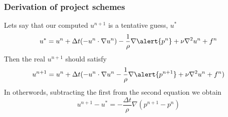 \begin{frame}
\frametitle{Derivation of project schemes}
Lets say that our computed $u^{n+1}$ is a tentative guess, $u^*$ 
\[   
u^{*} = u^n + \Delta t ( -u^n \cdot \nabla u^n)
    -\frac{1}{\rho}\nabla \alert{p^n}  + \nu \nabla^2 u^n + f^n 
\]
Then the real $u^{n+1}$ should satisfy
\[   
u^{n+1} = u^n + \Delta t ( -u^n \cdot \nabla u^n
    -\frac{1}{\rho}\nabla \alert{p^{n+1}}  + \nu \nabla^2 u^n + f^n) 
\]
In otherwords, subtracting the first from the second equation we obtain
\[
u^{n+1} - u^* = -\frac{\Delta t}{\rho} \nabla (p^{n+1} - p^n) 
\]



\end{frame}


